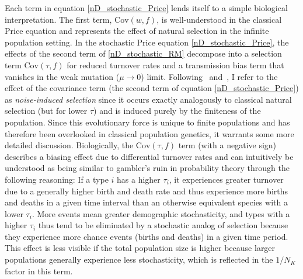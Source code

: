 Each term in equation \eqref{nD_stochastic_Price} lends itself to a simple biological interpretation. The first term, $\textrm{Cov}(w,f)$, is well-understood in the classical Price equation and represents the effect of natural selection in the infinite population setting. In the stochastic Price equation \eqref{nD_stochastic_Price}, the effects of the second term of 
\eqref{nD_stochastic_RM} decompose into a selection term $\textrm{Cov}(\tau,f)$ for reduced turnover rates and a transmission bias term that vanishes in the weak mutation ($\mu \to 0$) limit. Following~\cite{constable_demographic_2016} and~\cite{week_white_2021}, I refer to the effect of the covariance term (the second term of equation \eqref{nD_stochastic_Price}) as \emph{noise-induced selection} since it occurs exactly analogously to classical natural selection (but for lower $\tau$) and is induced purely by the finiteness of the population. Since this evolutionary force is unique to finite populations and has therefore been overlooked in classical population genetics, it warrants some more detailed discussion. Biologically, the $\textrm{Cov}(\tau,f)$ term (with a negative sign) describes a biasing effect due to differential turnover rates and can intuitively be understood as being similar to gambler's ruin in probability theory through the following reasoning: If a type $i$ has a higher $\tau_i$, it experiences greater turnover due to a generally higher birth and death rate and thus experience more births and deaths in a given time interval than an otherwise equivalent species with a lower $\tau_i$. More events mean greater demographic stochasticity, and types with a higher $\tau_i$ thus tend to be eliminated by a stochastic analog of selection because they experience more chance events (births and deaths) in a given time period. This effect is less visible if the total population size is higher because larger populations generally experience less stochasticity, which is reflected in the $1/N_K$ factor in this term.

